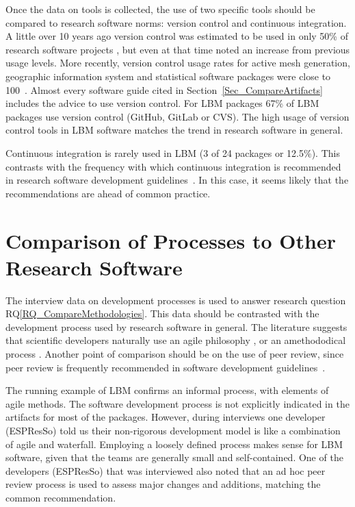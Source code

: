 \documentclass[runningheads]{llncs}
\newcommand{\rqref}[1]{RQ\ref{#1}}
\begin{document}
Once the data on tools is collected, the use of two specific tools should be
compared to research software norms: version control and continuous integration.
A little over 10 years ago version control was estimated to be used in only 50\%
of research software projects \cite{Nguyen-HoanEtAl2010}, but even at that time
\cite{Nguyen-HoanEtAl2010} noted an increase from previous usage levels. More
recently, version control usage rates for active mesh generation, geographic
information system and statistical software packages were close to
100~\cite{Smith2018}.  Almost every software guide cited in
Section~\ref{Sec_CompareArtifacts} includes the advice to use version control.
For LBM packages 67\% of LBM packages use version control (GitHub, GitLab or
CVS). The high usage of version control tools in LBM software matches the trend
in research software in general.

Continuous integration is rarely used in LBM (3 of 24 packages or 12.5\%). This
contrasts with the frequency with which continuous integration is recommended in
research software development
guidelines~\cite{BrettEtAl2021,vanGompelEtAl2016,ThielEtAl2020}. In this case,
it seems likely that the recommendations are ahead of common practice.

\section{Comparison of Processes to Other Research Software} \label{Sec_CompareMethodologies}

The interview data on development processes is used to answer research question
\rqref{RQ_CompareMethodologies}.  This data should be contrasted with the
development process used by research software in general. The literature
suggests that scientific developers naturally use an agile philosophy
\cite{CarverEtAl2007,Segal2005}, or an amethododical process \cite{Kelly2013}.
Another point of comparison should be on the use of peer review, since peer
review is frequently recommended in software development
guidelines~\cite{HerouxEtAl2008,OrvizEtAl2017,USGS2019}.

The running example of LBM confirms an informal process, with elements of agile
methods. The software development process is not explicitly indicated in the
artifacts for most of the packages. However, during interviews one developer
(ESPResSo) told us their non-rigorous development model is like a combination of
agile and waterfall. Employing a loosely defined process makes sense for LBM
software, given that the teams are generally small and self-contained. One of
the developers (ESPResSo) that was interviewed also noted that an ad hoc peer
review process is used to assess major changes and additions, matching the
common recommendation.
\end{document}
